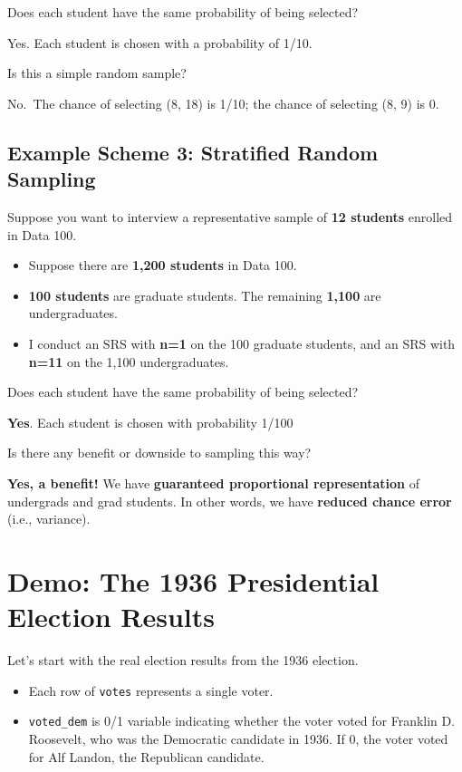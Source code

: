 \documentclass[
  letterpaper,
  DIV=11,
  numbers=noendperiod]{scrreprt}
\providecommand{\tightlist}{%
  \setlength{\itemsep}{0pt}\setlength{\parskip}{0pt}}\usepackage{longtable,booktabs,array}
\begin{document}
Does each student have the same probability of being selected?

Yes. Each student is chosen with a probability of 1/10.

Is this a simple random sample?

No.~The chance of selecting (8, 18) is 1/10; the chance of selecting (8,
9) is 0.

\subsection{Example Scheme 3: Stratified Random
Sampling}\label{example-scheme-3-stratified-random-sampling}

Suppose you want to interview a representative sample of \textbf{12
students} enrolled in Data 100.

\begin{itemize}
\tightlist
\item
  Suppose there are \textbf{1,200 students} in Data 100.
\item
  \textbf{100 students} are graduate students. The remaining
  \textbf{1,100} are undergraduates.
\item
  I conduct an SRS with \textbf{n=1} on the 100 graduate students, and
  an SRS with \textbf{n=11} on the 1,100 undergraduates.
\end{itemize}

Does each student have the same probability of being selected?

\textbf{Yes}. Each student is chosen with probability 1/100

Is there any benefit or downside to sampling this way?

\textbf{Yes, a benefit!} We have \textbf{guaranteed proportional
representation} of undergrads and grad students. In other words, we have
\textbf{reduced chance error} (i.e., variance).

\section{Demo: The 1936 Presidential Election
Results}\label{demo-the-1936-presidential-election-results}

Let's start with the real election results from the 1936 election.

\begin{itemize}
\tightlist
\item
  Each row of \texttt{votes} represents a single voter.
\item
  \texttt{voted\_dem} is 0/1 variable indicating whether the voter voted
  for Franklin D. Roosevelt, who was the Democratic candidate in 1936.
  If 0, the voter voted for Alf Landon, the Republican candidate.
\end{itemize}
\end{document}
